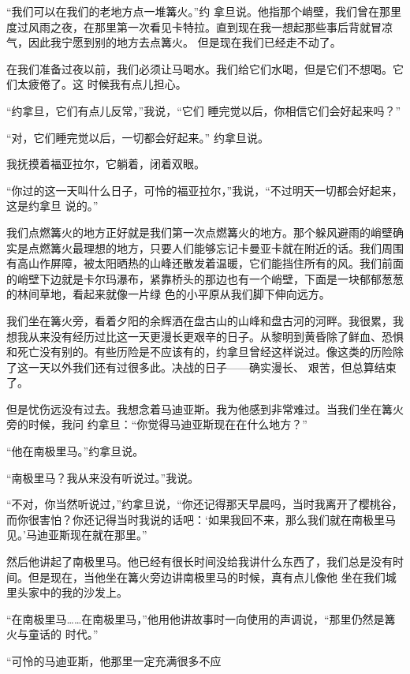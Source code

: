 \documentclass{article}
\begin{document}
“我们可以在我们的老地方点一堆篝火。”约
\newpage
拿旦说。他指那个峭壁，我们曾在那里度过风雨之夜，在那里第一次看见卡特拉。直到现在我一想起那些事后背就冒凉气，因此我宁愿到别的地方去点篝火。
但是现在我们已经走不动了。 

在我们准备过夜以前，我们必须让马喝水。我们给它们水喝，但是它们不想喝。它们太疲倦了。这
时候我有点儿担心。 

“约拿旦，它们有点儿反常，”我说，“它们
睡完觉以后，你相信它们会好起来吗？” 

“对，它们睡完觉以后，一切都会好起来。”
约拿旦说。 


我抚摸着福亚拉尔，它躺着，闭着双眼。 

“你过的这一天叫什么日子，可怜的福亚拉尔，”我说，“不过明天一切都会好起来，这是约拿旦
说的。” 

\newpage

我们点燃篝火的地方正好就是我们第一次点燃篝火的地方。那个躲风避雨的峭壁确实是点燃篝火最理想的地方，只要人们能够忘记卡曼亚卡就在附近的话。我们周围有高山作屏障，被太阳晒热的山峰还散发着温暖，它们能挡住所有的风。我们前面的峭壁下边就是卡尔玛瀑布，紧靠桥头的那边也有一个峭壁，下面是一块郁郁葱葱的林间草地，看起来就像一片绿
色的小平原从我们脚下伸向远方。 

我们坐在篝火旁，看着夕阳的余辉洒在盘古山的山峰和盘古河的河畔。我很累，我想我从来没有经历过比这一天更漫长更艰辛的日子。从黎明到黄昏除了鲜血、恐惧和死亡没有别的。有些历险是不应该有的，约拿旦曾经这样说过。像这类的历险除了这一天以外我们还有过很多此。决战的日子——确实漫长、
艰苦，但总算结束了。 

但是忧伤远没有过去。我想念着马迪亚斯。我为他感到非常难过。当我们坐在篝火旁的时候，我问
约拿旦：“你觉得马迪亚斯现在在什么地方？” 

\newpage


“他在南极里马。”约拿旦说。 


“南极里马？我从来没有听说过。”我说。 

“不对，你当然听说过，”约拿旦说，“你还记得那天早晨吗，当时我离开了樱桃谷，而你很害怕？你还记得当时我说的话吧：‘如果我回不来，那么我们就在南极里马见。’马迪亚斯现在就在那里。”
 

然后他讲起了南极里马。他已经有很长时间没给我讲什么东西了，我们总是没有时间。但是现在，当他坐在篝火旁边讲南极里马的时候，真有点儿像他
坐在我们城里头家中的我的沙发上。 

“在南极里马……在南极里马，”他用他讲故事时一向使用的声调说，“那里仍然是篝火与童话的
时代。” 

“可怜的马迪亚斯，他那里一定充满很多不应
\end{document}
